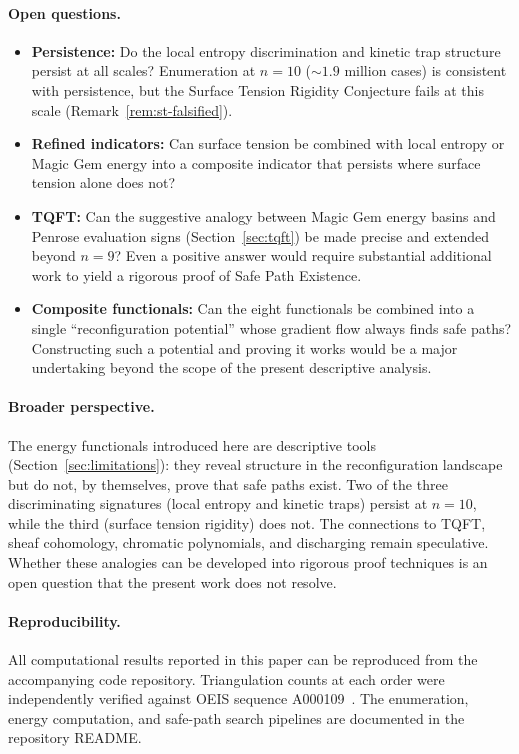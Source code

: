 \paragraph{Open questions.}
\begin{itemize}
  \item \textbf{Persistence:} Do the local entropy discrimination and
    kinetic trap structure persist at all scales? Enumeration at
    $n = 10$ (${\sim}1.9$ million cases) is consistent with
    persistence, but the Surface Tension Rigidity Conjecture fails at
    this scale (Remark~\ref{rem:st-falsified}).
  \item \textbf{Refined indicators:} Can surface tension be combined
    with local entropy or Magic Gem energy into a composite indicator
    that persists where surface tension alone does not?
  \item \textbf{TQFT:} Can the suggestive analogy between
    Magic Gem energy basins and Penrose evaluation signs
    (Section~\ref{sec:tqft}) be made precise and extended beyond
    $n = 9$? Even a positive answer would require substantial
    additional work to yield a rigorous proof of Safe Path Existence.
  \item \textbf{Composite functionals:} Can the eight functionals be
    combined into a single ``reconfiguration potential'' whose gradient
    flow always finds safe paths? Constructing such a potential and
    proving it works would be a major undertaking beyond the scope of
    the present descriptive analysis.
\end{itemize}

\paragraph{Broader perspective.}
The energy functionals introduced here are descriptive tools
(Section~\ref{sec:limitations}): they reveal structure in the
reconfiguration landscape but do not, by themselves, prove that safe
paths exist. Two of the three discriminating signatures (local entropy
and kinetic traps) persist at $n = 10$, while the third (surface
tension rigidity) does not. The connections to TQFT, sheaf cohomology,
chromatic polynomials, and discharging remain speculative. Whether these
analogies can be developed into rigorous proof techniques is an open
question that the present work does not resolve.

\paragraph{Reproducibility.}
All computational results reported in this paper can be reproduced from
the accompanying code repository. Triangulation counts at each order
were independently verified against OEIS sequence
A000109~\cite{oeis_A000109}. The enumeration, energy computation, and
safe-path search pipelines are documented in the repository README.
